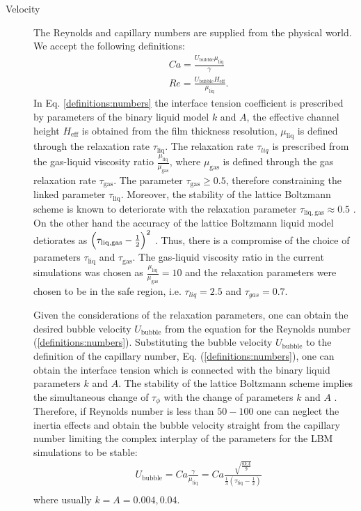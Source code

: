 \documentclass{article}
\begin{document}
\begin{description}
\item[Velocity] The Reynolds and capillary numbers are supplied from the physical world. We
accept the following definitions:
\begin{equation}
\label{definitions:numbers}
\begin{aligned}
&Ca=\frac{U_{\mathrm{bubble}} \mu_{\mathrm{liq}}}{\gamma} \\
&Re=\frac{U_{\mathrm{bubble}} H_{\mathrm{eff}}}{\mu_{\mathrm{liq}}}.
\end{aligned}
\end{equation}
In Eq. \eqref{definitions:numbers} the interface tension coefficient is prescribed by parameters of
the binary liquid model $k$ and $A$, the effective channel height $H_{\mathrm{eff}}$ is obtained
from the film thickness resolution, $\mu_{\mathrm{liq}}$ is defined through the relaxation rate
$\tau_{\mathrm{liq}}$. The relaxation rate $\tau_{liq}$ is prescribed from the gas-liquid viscosity
ratio $\frac{\mu_{\mathrm{liq}}}{\mu_{\mathrm{gas}}}$, where $\mu_{\mathrm{gas}}$ is defined through
the gas relaxation rate $\tau_{\mathrm{gas}}$. The parameter $\tau_{\mathrm{gas}}\geq 0.5$, therefore
 constraining the linked parameter $\tau_{\mathrm{liq}}$. Moreover,
the stability of the lattice Boltzmann scheme is known to deteriorate with the relaxation parameter
$\tau_{\mathrm{liq},\mathrm{gas}}\approx 0.5$ \cite{kuzmin-trt-stability}. On the other hand the
accuracy of the lattice Boltzmann liquid model detiorates as
$\Bigl(\tau_{\mathrm{liq},\mathrm{gas}}-\frac{1}{2}\Bigr)^2$ \cite{ginzburg-trt-simple-hydro}. Thus,
there is a compromise of the choice of parameters $\tau_{\mathrm{liq}}$ and $\tau_{\mathrm{gas}}$.
The gas-liquid viscosity ratio in the current simulations was chosen as
$\frac{\mu_{\mathrm{liq}}}{\mu_{\mathrm{gas}}}=10$ and the relaxation parameters were chosen to be
in the safe region, i.e. $\tau_{liq}=2.5$ and $\tau_{gas}=0.7$. 

Given the considerations of the relaxation parameters, one can obtain the desired bubble velocity
$U_{\mathrm{bubble}}$ from the equation for the Reynolds number (\ref{definitions:numbers}).
Substituting the bubble velocity $U_{\mathrm{bubble}}$ to the definition of the capillary number,
Eq. (\ref{definitions:numbers}), one can obtain the interface tension which is connected with the
binary liquid parameters $k$ and $A$. The stability of the lattice Boltzmann scheme implies the
simultaneous change of $\tau_{\phi}$ with the change of parameters $k$ and $A$
\cite{pagonabarraga-parameters}. Therefore, if Reynolds number is less than
$50-100$ one can neglect the inertia effects and obtain the bubble velocity straight from the
capillary number limiting the complex interplay of the parameters for the LBM simulations to be
stable: 
\begin{equation}
\begin{aligned}
&U_{\mathrm{bubble}}=Ca \frac{\gamma}{\mu_{\mathrm{liq}}}=Ca \frac{\sqrt{\frac{8 k
A}{9}}}{\frac{1}{3}(\tau_{\mathrm{liq}}-\frac{1}{2})}\\
\end{aligned}
\end{equation}
where usually $k=A=0.004,0.04$.


\end{description}
\end{document}
